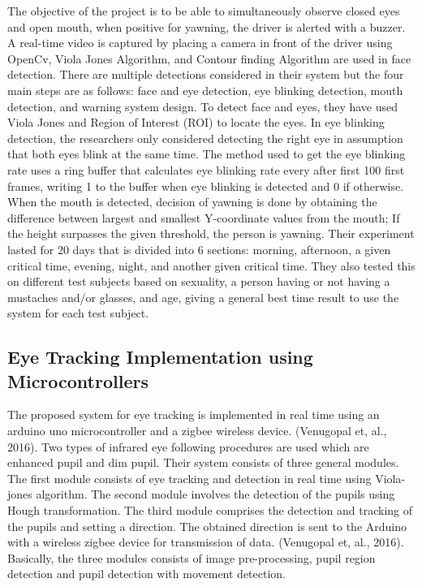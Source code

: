 The objective of the project is to be able to simultaneously observe closed eyes and open mouth, when positive for yawning, the driver is alerted with a buzzer. A real-time video is captured by placing a camera in front of the driver using OpenCv, Viola Jones Algorithm, and Contour finding Algorithm are used in face detection. There are multiple detections considered in their system but the four main steps are as follows: face and eye detection, eye blinking detection, mouth detection, and warning system design. To detect face and eyes, they have used Viola Jones and Region of Interest (ROI) to locate the eyes. In eye blinking detection, the researchers only considered detecting the right eye in assumption that both eyes blink at the same time. The method used to get the eye blinking rate uses a ring buffer that calculates eye blinking rate every after first 100 first frames, writing 1 to the buffer when eye blinking is detected and 0 if otherwise. When the mouth is detected, decision of yawning is done by obtaining the difference between largest and smallest Y-coordinate values from the mouth; If the height surpasses the given threshold, the person is yawning. Their experiment lasted for 20 days that is divided into 6 sections: morning, afternoon, a given critical time, evening, night, and another given critical time. They also tested this on different test subjects based on sexuality, a person having or not having a mustaches and/or glasses, and age, giving a general best time result to use the system for each test subject.


\subsection{Eye Tracking Implementation using Microcontrollers}
The proposed system for eye tracking is implemented in real time using an arduino uno microcontroller and a zigbee wireless device. (Venugopal et, al., 2016). Two types of infrared eye following procedures are used which are enhanced pupil and dim pupil. Their system consists of three general modules. The first module consists of eye tracking and detection in real time using Viola-jones algorithm. The second module involves the detection of the pupils using Hough transformation. The third module  comprises the detection and tracking of the pupils and setting a direction. The obtained direction is sent to the Arduino with a wireless zigbee device for transmission of data. (Venugopal et, al., 2016). Basically, the three modules consists of image pre-processing, pupil region detection and pupil detection with movement detection. 
\newline

